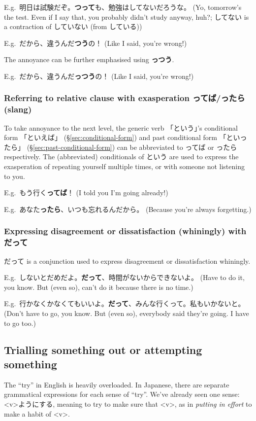 \documentclass[../nihongo-gakushuu-kyouzai.tex]{subfiles}
\begin{document}
E.g.\ 明日は試験だぞ。\textbf{つって}も、勉強はしてないだろうな。 (Yo, tomorrow's the test. Even if I say that, you probably didn't study anyway, huh?; してない is a contraction of していない (from している))

E.g.\ だから、違うんだ\textbf{つう}の！ (Like I said, you're wrong!)

The annoyance can be further emphasised using \textbf{っつう}.

E.g.\ だから、違うんだ\textbf{っつう}の！ (Like I said, you're wrong!)


\subsubsection{Referring to relative clause with exasperation ってば/ったら (slang)} \label{sec:referring-to-relative-clause-exasperation-slang}
To take annoyance to the next level, the generic verb 「という」's conditional form 「といえば」 (\S\ref{sec:conditional-form}) and past conditional form 「といったら」 (\S\ref{sec:past-conditional-form}) can be abbreviated to ってば or ったら respectively. The (abbreviated) conditionals of という are used to express the exasperation of repeating yourself multiple times, or with someone not listening to you.

E.g.\ もう行く\textbf{ってば}！ (I told you I'm going already!)

E.g.\ あなた\textbf{ったら}、いつも忘れるんだから。 (Because you're always forgetting.)


\subsubsection{Expressing disagreement or dissatisfaction (whiningly) with だって}
だって is a conjunction used to express disagreement or dissatisfaction whiningly.

E.g.\ しないとだめだよ。\textbf{だって}、時間がないからできないよ。 (Have to do it, you know. But (even so), can't do it because there is no time.)

E.g.\ 行かなくかなくてもいいよ。\textbf{だって}、みんな行くって。私もいかないと。 (Don't have to go, you know. But (even so), everybody said they're going. I have to go too.)


\subsection{Trialling something out or attempting something} \label{sec:trialling-something-out-or-attempting-something}
The ``try'' in English is heavily overloaded. In Japanese, there are separate grammatical expressions for each sense of ``try''. We've already seen one sense: <v>ようにする, meaning to try to make sure that <v>, as in \emph{putting in effort} to make a habit of <v>.
\end{document}

